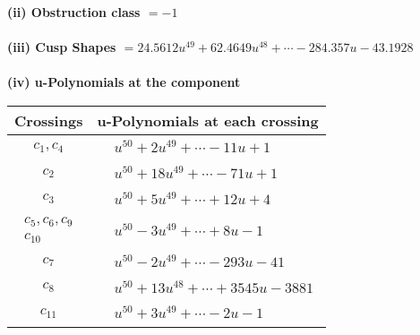 \documentclass[1p]{elsarticle_modified}
\theoremstyle{definition}
\begin{document}
\flushleft \textbf{(ii) Obstruction class $= -1$}\\~\\
\flushleft \textbf{(iii) Cusp Shapes $= 24.5612 u^{49}+62.4649 u^{48}+\cdots-284.357 u-43.1928$}\\~\\
\newpage\renewcommand{\arraystretch}{1}
\flushleft \textbf{(iv) u-Polynomials at the component}\newline \\
\begin{tabular}{m{50pt}|m{274pt}}
Crossings & \hspace{64pt}u-Polynomials at each crossing \\
\hline $$\begin{aligned}c_{1},c_{4}\end{aligned}$$&$\begin{aligned}
&u^{50}+2 u^{49}+\cdots-11 u+1
\end{aligned}$\\
\hline $$\begin{aligned}c_{2}\end{aligned}$$&$\begin{aligned}
&u^{50}+18 u^{49}+\cdots-71 u+1
\end{aligned}$\\
\hline $$\begin{aligned}c_{3}\end{aligned}$$&$\begin{aligned}
&u^{50}+5 u^{49}+\cdots+12 u+4
\end{aligned}$\\
\hline $$\begin{aligned}c_{5},c_{6},c_{9}\\c_{10}\end{aligned}$$&$\begin{aligned}
&u^{50}-3 u^{49}+\cdots+8 u-1
\end{aligned}$\\
\hline $$\begin{aligned}c_{7}\end{aligned}$$&$\begin{aligned}
&u^{50}-2 u^{49}+\cdots-293 u-41
\end{aligned}$\\
\hline $$\begin{aligned}c_{8}\end{aligned}$$&$\begin{aligned}
&u^{50}+13 u^{48}+\cdots+3545 u-3881
\end{aligned}$\\
\hline $$\begin{aligned}c_{11}\end{aligned}$$&$\begin{aligned}
&u^{50}+3 u^{49}+\cdots-2 u-1
\end{aligned}$\\
\hline
\end{tabular}\\~\\
\end{document}
